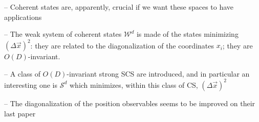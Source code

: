 
{ \color{gray}

\lin


\cite{FioreTheCase2020}
-- Coherent states are, apparently, crucial if we want these spaces to have applications

-- The weak system of coherent states $\mathcal W^d$ is made of the states minimizing $(\Delta \vec x)^2$: they are related to the diagonalization of the coordinates $x_i$; they are $O(D)$-invariant.

-- A class of $O(D)$-invariant strong SCS are introduced, and in particular an interesting one is $\mathcal S^d$ which minimizes, within this class of CS, $(\Delta \vec x)^2$

-- The diagonalization of the position observables seems to be improved on their last paper

\lin



}
